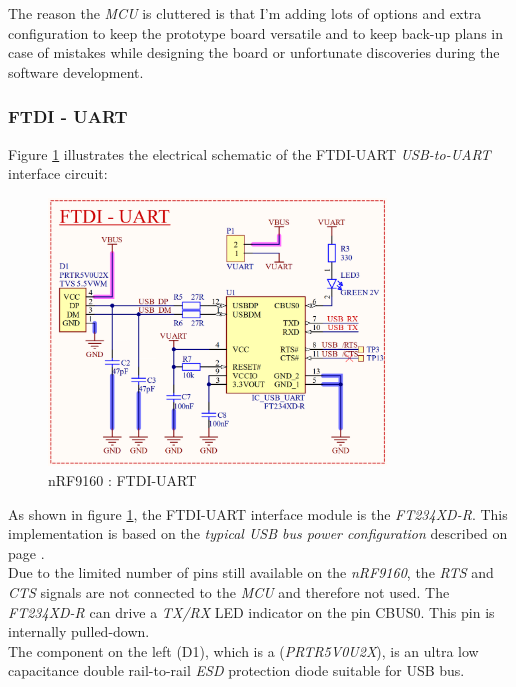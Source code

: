 \documentclass[report.tex]{subfiles}
\begin{document}
The reason the \textit{MCU} is cluttered is that I'm adding lots of options and extra configuration to keep the prototype board versatile and to keep back-up plans in case of mistakes while designing the board or unfortunate discoveries during the software development.

\subsubsection{FTDI - UART}

Figure \ref{fig:LTEWatch_nRF9160_FTDI_UART} illustrates the electrical schematic of the FTDI-UART \textit{USB-to-UART} interface circuit:

\begin{figure}[H]
	\centering
	\includegraphics[width=0.8\textwidth]{Include/Figure/Hardware/LTEWatch_nRF9160_FTDI-UART}
	\caption{nRF9160 : FTDI-UART}
	\label{fig:LTEWatch_nRF9160_FTDI_UART}
\end{figure}

As shown in figure \ref{fig:LTEWatch_nRF9160_FTDI_UART}, the FTDI-UART interface module is the \textit{FT234XD-R}. This implementation is based on the \textit{typical USB bus power configuration} described on page \pageref{sec:ftdi_usb_app}.\\

Due to the limited number of pins still available on the \textit{nRF9160}, the \textit{RTS} and \textit{CTS} signals are not connected to the \textit{MCU} and therefore not used. The \textit{FT234XD-R} can drive a \textit{TX/RX} LED indicator on the pin CBUS0. This pin is internally pulled-down.\\

The component on the left (D1), which is a (\textit{PRTR5V0U2X}\cite{PRTR5V0U2X}), is an ultra low capacitance double rail-to-rail \textit{ESD} protection diode suitable for USB bus.\\
\end{document}

